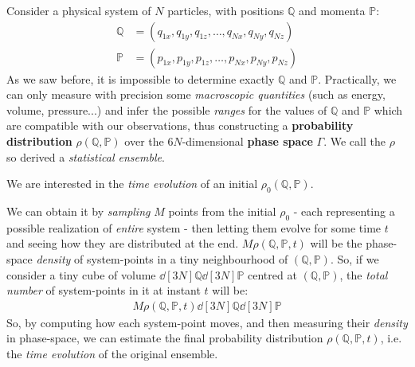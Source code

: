 \documentclass[../template.tex]{subfiles}
\begin{document}
Consider a physical system of $N$ particles, with positions $\mathbb{Q}$ and momenta $\mathbb{P}$:
\begin{align*}
    \mathbb{Q} &= (q_{1x}, q_{1y}, q_{1z}, \dots, q_{Nx}, q_{Ny}, q_{Nz})\\
    \mathbb{P} &= (p_{1x}, p_{1y}, p_{1z}, \dots, p_{Nx}, p_{Ny}, p_{Nz})
\end{align*} 
As we saw before, it is impossible to determine exactly $\mathbb{Q}$ and $\mathbb{P}$. Practically, we can only measure with precision some \textit{macroscopic quantities} (such as energy, volume, pressure...) and infer the possible \textit{ranges} for the values of $\mathbb{Q}$ and $\mathbb{P}$ which are compatible with our observations, thus constructing a \textbf{probability distribution} $\rho(\mathbb{Q},\mathbb{P})$ over the $6N$-dimensional \textbf{phase space} $\Gamma$. We call the $\rho$ so derived a \textit{statistical ensemble}. 

\medskip

We are interested in the \textit{time evolution} of an initial $\rho_0(\mathbb{Q},\mathbb{P})$. 

We can obtain it by \textit{sampling} $M$ points from the initial $\rho_0$ - each representing a possible realization of \textit{entire} system
- then letting them evolve for some time $t$ and seeing how they are distributed at the end. $M \rho(\mathbb{Q},\mathbb{P},t)$ will be the phase-space \textit{density} of system-points in a tiny neighbourhood of $(\mathbb{Q},\mathbb{P})$. So, if we consider a tiny cube of volume $\dd[3N]{\mathbb{Q}} \dd[3N]{\mathbb{P}}$ centred at $(\mathbb{Q},\mathbb{P})$, the \textit{total number} of system-points in it at instant $t$ will be:
\begin{align*}
    M \rho(\mathbb{Q},\mathbb{P},t) \dd[3N]{\mathbb{Q}} \dd[3N]{\mathbb{P}}
\end{align*} 
So, by computing how each system-point moves, and then measuring their \textit{density} in phase-space, we can estimate the final probability distribution $\rho(\mathbb{Q},\mathbb{P},t)$, i.e. the \textit{time evolution} of the original ensemble. 

\medskip
\end{document}
